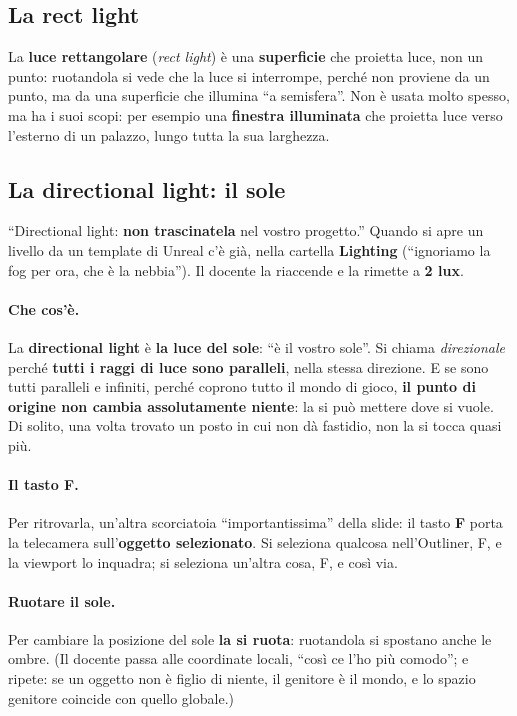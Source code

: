 \subsection{La rect light}

La \textbf{luce rettangolare} (\emph{rect light}) è una \textbf{superficie} che
proietta luce, non un punto: ruotandola si vede che la luce si interrompe,
perché non proviene da un punto, ma da una superficie che illumina ``a
semisfera''. Non è usata molto spesso, ma ha i suoi scopi: per esempio una
\textbf{finestra illuminata} che proietta luce verso l'esterno di un palazzo,
lungo tutta la sua larghezza.

\subsection{La directional light: il sole}

``Directional light: \textbf{non trascinatela} nel vostro progetto.'' Quando si
apre un livello da un template di Unreal c'è già, nella cartella
\textbf{Lighting} (``ignoriamo la fog per ora, che è la nebbia''). Il docente
la riaccende e la rimette a \textbf{2 lux}.

\paragraph{Che cos'è.} La \textbf{directional light} è \textbf{la luce del
sole}: ``è il vostro sole''. Si chiama \emph{direzionale} perché \textbf{tutti i
raggi di luce sono paralleli}, nella stessa direzione. E se sono tutti paralleli
e infiniti, perché coprono tutto il mondo di gioco, \textbf{il punto di origine
non cambia assolutamente niente}: la si può mettere dove si vuole. Di solito,
una volta trovato un posto in cui non dà fastidio, non la si tocca quasi più.

\paragraph{Il tasto F.} Per ritrovarla, un'altra scorciatoia ``importantissima''
della slide: il tasto \textbf{F} porta la telecamera sull'\textbf{oggetto
selezionato}. Si seleziona qualcosa nell'Outliner, F, e la viewport lo inquadra;
si seleziona un'altra cosa, F, e così via.

\paragraph{Ruotare il sole.} Per cambiare la posizione del sole \textbf{la si
ruota}: ruotandola si spostano anche le ombre. (Il docente passa alle coordinate
locali, ``così ce l'ho più comodo''; e ripete: se un oggetto non è figlio di
niente, il genitore è il mondo, e lo spazio genitore coincide con quello
globale.)

